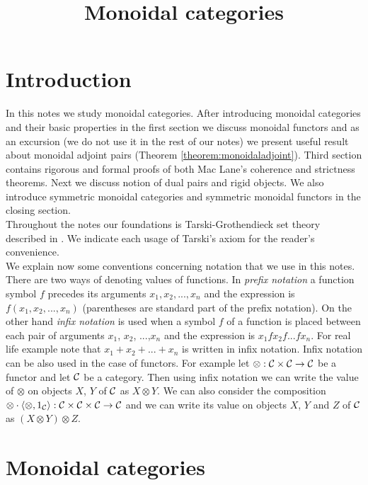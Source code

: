 



\title{Monoidal categories}
\date{}
\maketitle

\section{Introduction}
\noindent
In this notes we study monoidal categories. After introducing monoidal categories and their basic properties in the first section we discuss monoidal functors and as an excursion (we do not use it in the rest of our notes) we present useful result about monoidal adjoint pairs (Theorem \ref{theorem:monoidaladjoint}). Third section contains rigorous and formal proofs of both Mac Lane's coherence and strictness theorems. Next we discuss notion of dual pairs and rigid objects. We also introduce symmetric monoidal categories and symmetric monoidal functors in the closing section.\\
Throughout the notes our foundations is Tarski-Grothendieck set theory described in {\cite[Introduction]{Presheaves}}. We indicate each usage of Tarski's axiom for the reader's convenience.\\
We explain now some conventions concerning notation that we use in this notes. There are two ways of denoting values of functions. In \textit{prefix notation} a function symbol $f$ precedes its arguments $x_1,x_2,...,x_n$ and the expression is $f(x_1,x_2,...,x_n)$ (parentheses are standard part of the prefix notation). On the other hand \textit{infix notation} is used when a symbol $f$ of a function is placed between each pair of arguments $x_1$, $x_2$, ...,$x_n$ and the expression is $x_1 f x_2 f...fx_n$. For real life example note that $x_1+x_2+...+x_n$ is written in infix notation. Infix notation can be also used in the case of functors. For example let $\otimes:{\mathcal C}\times {\mathcal C}\rightarrow {\mathcal C}$ be a functor and let ${\mathcal C}$ be a category. Then using infix notation we can write the value of $\otimes$ on objects $X$, $Y$ of ${\mathcal C}$ as $X\otimes Y$. We can also consider the composition $\otimes\cdot \langle \otimes, 1_{{\mathcal C}}\rangle:{\mathcal C}\times {\mathcal C}\times {\mathcal C}\rightarrow {\mathcal C}$ and we can write its value on objects $X$, $Y$ and $Z$ of ${\mathcal C}$ as $(X\otimes Y)\otimes Z$.

\section{Monoidal categories}

